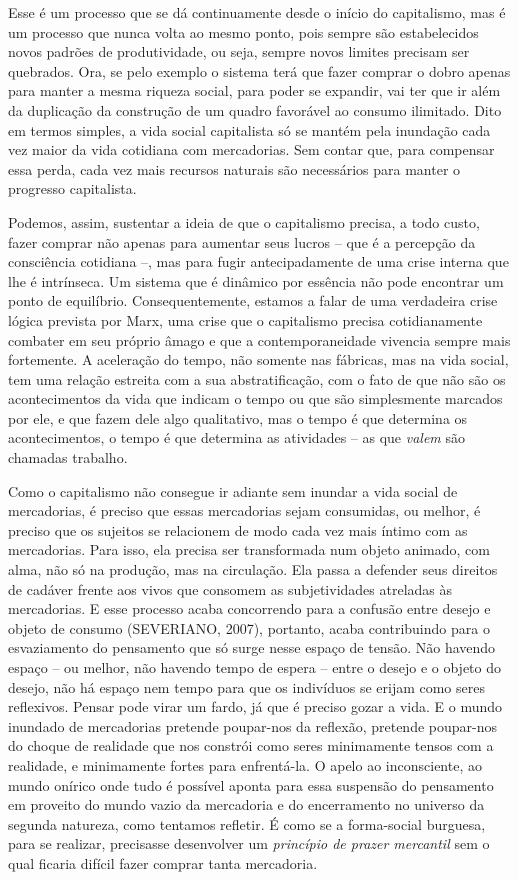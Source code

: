 Esse é um processo que se dá continuamente desde o início do
capitalismo, mas é um processo que nunca volta ao mesmo ponto, pois
sempre são estabelecidos novos padrões de produtividade, ou seja, sempre
novos limites precisam ser quebrados. Ora, se pelo exemplo o sistema
terá que fazer comprar o dobro apenas para manter a mesma riqueza
social, para poder se expandir, vai ter que ir além da duplicação da
construção de um quadro favorável ao consumo ilimitado. Dito em termos
simples, a vida social capitalista só se mantém pela inundação cada vez
maior da vida cotidiana com mercadorias. Sem contar que, para compensar
essa perda, cada vez mais recursos naturais são necessários para manter
o progresso capitalista.

Podemos, assim, sustentar a ideia de que o capitalismo precisa, a todo
custo, fazer comprar não apenas para aumentar seus lucros -- que é a
percepção da consciência cotidiana --, mas para fugir antecipadamente de
uma crise interna que lhe é intrínseca. Um sistema que é dinâmico por
essência não pode encontrar um ponto de equilíbrio. Consequentemente,
estamos a falar de uma verdadeira crise lógica prevista por Marx, uma
crise que o capitalismo precisa cotidianamente combater em seu próprio
âmago e que a contemporaneidade vivencia sempre mais fortemente. A
aceleração do tempo, não somente nas fábricas, mas na vida social, tem
uma relação estreita com a sua abstratificação, com o fato de que não
são os acontecimentos da vida que indicam o tempo ou que são
simplesmente marcados por ele, e que fazem dele algo qualitativo, mas o
tempo é que determina os acontecimentos, o tempo é que determina as
atividades -- as que \emph{valem} são chamadas trabalho.

Como o capitalismo não consegue ir adiante sem inundar a vida social de
mercadorias, é preciso que essas mercadorias sejam consumidas, ou
melhor, é preciso que os sujeitos se relacionem de modo cada vez mais
íntimo com as mercadorias. Para isso, ela precisa ser transformada num
objeto animado, com alma, não só na produção, mas na circulação. Ela
passa a defender seus direitos de cadáver frente aos vivos que consomem
as subjetividades atreladas às mercadorias. E esse processo acaba
concorrendo para a confusão entre desejo e objeto de consumo (SEVERIANO,
2007), portanto, acaba contribuindo para o esvaziamento do pensamento
que só surge nesse espaço de tensão. Não havendo espaço -- ou melhor,
não havendo tempo de espera -- entre o desejo e o objeto do desejo, não
há espaço nem tempo para que os indivíduos se erijam como seres
reflexivos. Pensar pode virar um fardo, já que é preciso gozar a vida. E
o mundo inundado de mercadorias pretende poupar-nos da reflexão,
pretende poupar-nos do choque de realidade que nos constrói como seres
minimamente tensos com a realidade, e minimamente fortes para
enfrentá-la. O apelo ao inconsciente, ao mundo onírico onde tudo é
possível aponta para essa suspensão do pensamento em proveito do mundo
vazio da mercadoria e do encerramento no universo da segunda natureza,
como tentamos refletir. É como se a forma-social burguesa, para se
realizar, precisasse desenvolver um \emph{princípio de prazer mercantil}
sem o qual ficaria difícil fazer comprar tanta mercadoria.

